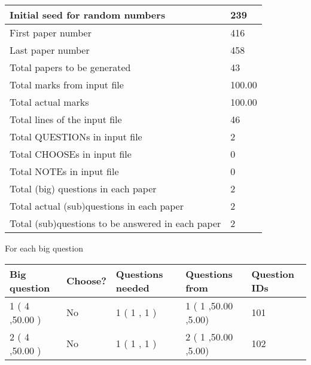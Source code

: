 \documentclass[12pt]{article}
\begin{document}
 \begin{tabular}{|l|l|}
 \hline
 Initial seed for random numbers & 239  \\
\hline
 First paper number & 416  \\
\hline
 Last  paper number & 458  \\
\hline
 Total papers to be generated & 43  \\
\hline
Total marks from input file & 100.00 \\
\hline
Total actual marks & 100.00 \\
\hline
 Total lines of the input file & 46  \\
 \hline
 Total QUESTIONs in input file & 2  \\
\hline
 Total CHOOSEs in input file & 0  \\
\hline
 Total NOTEs in input file & 0  \\
\hline
 Total (big) questions in each paper & 2  \\
\hline
 Total actual (sub)questions in each paper & 2  \\
\hline
 Total (sub)questions to be answered in each paper & 2  \\
\hline
 \end{tabular}
   
   
 \newpage
   
{\LARGE{For each big question}}
   
   
\vspace{0.2in}
   
   
\noindent\hspace{-0.4in}\begin{tabular}{|l|l|l|l|l|}
\hline
 Big question & Choose? & Questions needed & Questions from & Question IDs \\ 
\hline
 1 ( 4 ,50.00
 ) &  No   & 
 1 ( 1 ,  1 ) &  1 ( 1
,50.00
 ,5.00) &  101  \\
 \hline
 2 ( 4 ,50.00
 ) &  No   & 
 1 ( 1 ,  1 ) &  2 ( 1
,50.00
 ,5.00) &  102  \\
 \hline
 \end{tabular}
 
 
\end{document}
